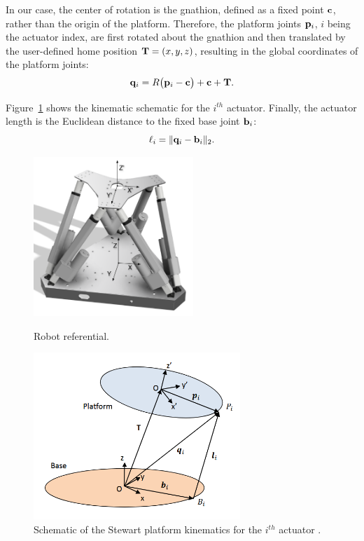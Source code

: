 In our case, the center of rotation is the gnathion, defined as a fixed point ${\bf c}$, rather than the origin of the platform. Therefore, 
the platform joints ${\bf p}_i$, $i$ being the actuator index, are first rotated about the gnathion and then translated by the user-defined 
home position ${\bf T}=(x,y,z)$, resulting in the global coordinates of the platform joints:
\[
{\bf q}_i = R\bigl({\bf p}_i-{\bf c}\bigr)+{\bf c}+{\bf T}.
\]

Figure~\ref{fig:kinematic_schematic} shows the kinematic schematic for the $i^{th}$ actuator.
Finally, the actuator length is the Euclidean distance to the fixed base joint ${\bf b}_i$:
\[
\ell_i = \lVert {\bf q}_i-{\bf b}_i\rVert_2.
\]

\begin{figure}[H]
\centering
\begin{minipage}{.45\textwidth}
  \centering
  \includegraphics[height=6cm]{figures/robot_referential.drawio.png}
  \caption{Robot referential.}
  \label{fig:robot_referential}
\end{minipage}
\begin{minipage}{.5\textwidth}
  \centering
  \includegraphics[height=6.3cm]{figures/kinematic_schematic.png}
  \caption{Schematic of the Stewart platform kinematics for the $i^{th}$ actuator \cite{instructables2024}.}
  \label{fig:kinematic_schematic}
\end{minipage}
\end{figure}

